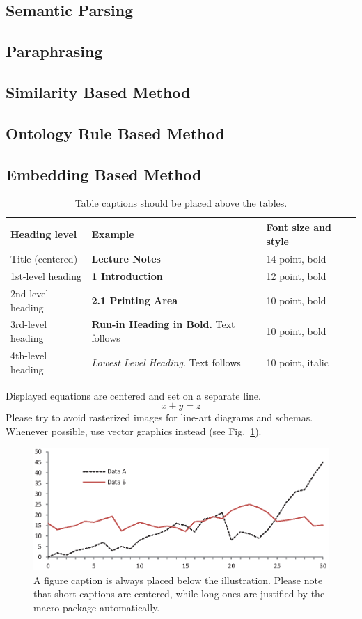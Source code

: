 \documentclass[runningheads]{llncs}
\begin{document}
\subsection{Semantic Parsing}
\subsection{Paraphrasing}
\subsection{Similarity Based Method}
\subsection{Ontology Rule Based Method}
\subsection{Embedding Based Method}

\begin{table}
\caption{Table captions should be placed above the
tables.}\label{tab1}
\begin{tabular}{|l|l|l|}
\hline
Heading level &  Example & Font size and style\\
\hline
Title (centered) &  {\Large\bfseries Lecture Notes} & 14 point, bold\\
1st-level heading &  {\large\bfseries 1 Introduction} & 12 point, bold\\
2nd-level heading & {\bfseries 2.1 Printing Area} & 10 point, bold\\
3rd-level heading & {\bfseries Run-in Heading in Bold.} Text follows & 10 point, bold\\
4th-level heading & {\itshape Lowest Level Heading.} Text follows & 10 point, italic\\
\hline
\end{tabular}
\end{table}


\noindent Displayed equations are centered and set on a separate
line.
\begin{equation}
x + y = z
\end{equation}
Please try to avoid rasterized images for line-art diagrams and
schemas. Whenever possible, use vector graphics instead (see
Fig.~\ref{fig1}).

\begin{figure}
\includegraphics[width=\textwidth]{fig1.eps}
\caption{A figure caption is always placed below the illustration.
Please note that short captions are centered, while long ones are
justified by the macro package automatically.} \label{fig1}
\end{figure}
\end{document}
